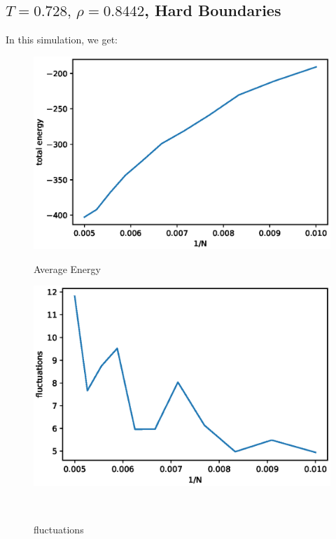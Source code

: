 \documentclass[UTF8,a4paper]{article}
\begin{document}
\subsection{$T =0.728,\, \rho = 0.8442$, Hard Boundaries}
In this simulation, we get:
\begin{figure}[H]
	\centering
	\begin{minipage}[t]{0.45\textwidth}
		\centering
		\includegraphics[height=0.2\textheight]{fig/sc_exp1_e_hard.eps}
		\caption{Average Energy}
	\end{minipage}\hspace{0.5cm}
	\begin{minipage}[t]{0.45\textwidth}
		\centering
		\includegraphics[height=0.2\textheight]{fig/sc_exp1_p_hard.eps}
		\caption{fluctuations}
	\end{minipage}\\
	\begin{minipage}[t]{0.6\textwidth}

\end{minipage}
\end{figure}
\end{document}
